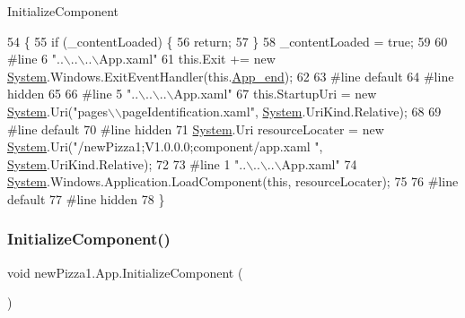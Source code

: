 Initialize\+Component 


\begin{DoxyCode}
54                                           \{
55             \textcolor{keywordflow}{if} (\_contentLoaded) \{
56                 \textcolor{keywordflow}{return};
57             \}
58             \_contentLoaded = \textcolor{keyword}{true};
59             
60 \textcolor{preprocessor}{            #line 6 "..\(\backslash\)..\(\backslash\)..\(\backslash\)App.xaml"
}
61             this.Exit += \textcolor{keyword}{new} \hyperlink{namespaceSystem}{System}.Windows.ExitEventHandler(this.\hyperlink{classnewPizza1_1_1App_adb889537b1e18b9309daa743947fd0db}{App\_end});
62             
63 \textcolor{preprocessor}{            #line default
}
64 \textcolor{preprocessor}{            #line hidden
}
65             
66 \textcolor{preprocessor}{            #line 5 "..\(\backslash\)..\(\backslash\)..\(\backslash\)App.xaml"
}
67             this.StartupUri = \textcolor{keyword}{new} \hyperlink{namespaceSystem}{System}.Uri(\textcolor{stringliteral}{"pages\(\backslash\)\(\backslash\)pageIdentification.xaml"}, 
      \hyperlink{namespaceSystem}{System}.UriKind.Relative);
68             
69 \textcolor{preprocessor}{            #line default
}
70 \textcolor{preprocessor}{            #line hidden
}
71             \hyperlink{namespaceSystem}{System}.Uri resourceLocater = \textcolor{keyword}{new} \hyperlink{namespaceSystem}{System}.Uri(\textcolor{stringliteral}{"/newPizza1;V1.0.0.0;component/app.xaml
      "}, \hyperlink{namespaceSystem}{System}.UriKind.Relative);
72             
73 \textcolor{preprocessor}{            #line 1 "..\(\backslash\)..\(\backslash\)..\(\backslash\)App.xaml"
}
74             \hyperlink{namespaceSystem}{System}.Windows.Application.LoadComponent(\textcolor{keyword}{this}, resourceLocater);
75             
76 \textcolor{preprocessor}{            #line default
}
77 \textcolor{preprocessor}{            #line hidden
}
78         \}
\end{DoxyCode}
\mbox{\label{classnewPizza1_1_1App_a437c6582c386ee3f9ee1419133aae6be}} 
\subsubsection{\texorpdfstring{Initialize\+Component()}{InitializeComponent()}\hspace{0.1cm}{\footnotesize\ttfamily [2/2]}}
{\footnotesize\ttfamily void new\+Pizza1.\+App.\+Initialize\+Component (\begin{DoxyParamCaption}{ }\end{DoxyParamCaption})\hspace{0.3cm}{\ttfamily [inline]}}



